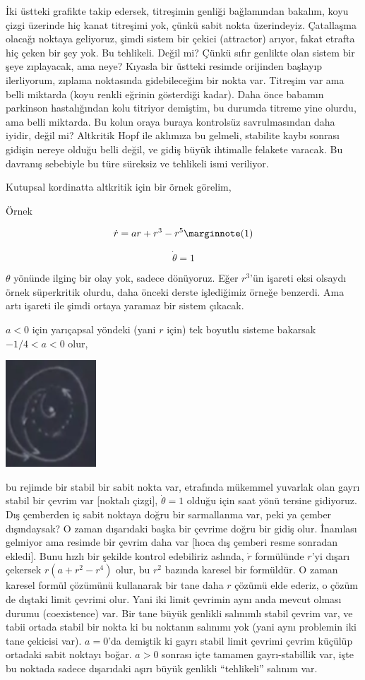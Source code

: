 \documentclass[12pt,fleqn]{article}\usepackage{../../common}
\begin{document}
İki üstteki grafikte takip edersek, titreşimin genliği bağlamından bakalım,
koyu çizgi üzerinde hiç kanat titreşimi yok, çünkü sabit nokta
üzerindeyiz. Çatallaşma olacağı noktaya geliyoruz, şimdi sistem bir çekici
(attractor) arıyor, fakat etrafta hiç çeken bir şey yok. Bu
tehlikeli. Değil mi?  Çünkü sıfır genlikte olan sistem bir şeye zıplayacak,
ama neye? Kıyasla bir üstteki resimde orijinden başlayıp ilerliyorum,
zıplama noktasında gidebileceğim bir nokta var. Titreşim var ama belli
miktarda (koyu renkli eğrinin gösterdiği kadar). Daha önce babamın
parkinson hastalığından kolu titriyor demiştim, bu durumda titreme yine
olurdu, ama belli miktarda. Bu kolun oraya buraya kontrolsüz savrulmasından
daha iyidir, değil mi? Altkritik Hopf ile aklımıza bu gelmeli, stabilite
kaybı sonrası gidişin nereye olduğu belli değil, ve gidiş büyük ihtimalle
felakete varacak. Bu davranış sebebiyle bu türe süreksiz ve tehlikeli ismi
veriliyor.

Kutupsal kordinatta altkritik için bir örnek görelim,

Örnek

$$ 
\dot{r} = ar + r^3 -r^5 
\mlabel{1} 
$$

$$ \dot{\theta} = 1 $$

$\theta$ yönünde ilginç bir olay yok, sadece dönüyoruz. Eğer $r^3$'ün
işareti eksi olsaydı örnek süperkritik olurdu, daha önceki derste
işlediğimiz örneğe benzerdi. Ama artı işareti ile şimdi ortaya yaramaz bir
sistem çıkacak.

$a < 0$ için yarıçapsal yöndeki (yani $r$ için) tek boyutlu sisteme
bakarsak $-1/4 < a < 0$ olur, 

\includegraphics[height=4cm]{13_06.png}

bu rejimde bir stabil bir sabit nokta var, etrafında mükemmel yuvarlak olan
gayrı stabil bir çevrim var [noktalı çizgi], $\dot{\theta}=1$ olduğu için
saat yönü tersine gidiyoruz. Dış çemberden iç sabit noktaya doğru bir
sarmallanma var, peki ya çember dışındaysak? O zaman dışarıdaki başka bir
çevrime doğru bir gidiş olur. İnanılası gelmiyor ama resimde bir çevrim
daha var [hoca dış çemberi resme sonradan ekledi]. Bunu hızlı bir şekilde
kontrol edebiliriz aslında, $\dot{r}$ formülünde $r$'yi dışarı çekersek
$r(a + r^2 -r^4)$ olur, bu $r^2$ bazında karesel bir formüldür. O zaman
karesel formül çözümünü kullanarak bir tane daha $r$ çözümü elde ederiz, o
çözüm de dıştaki limit çevrimi olur. Yani iki limit çevrimin aynı anda
mevcut olması durumu (coexistence) var. Bir tane büyük genlikli salınımlı
stabil çevrim var, ve tabii ortada stabil bir nokta ki bu noktanın salınımı
yok (yani aynı problemin iki tane çekicisi var). $a=0$'da demiştik ki gayrı
stabil limit çevrimi çevrim küçülüp ortadaki sabit noktayı boğar. $a>0$
sonrası içte tamamen gayrı-stabillik var, işte bu noktada sadece dışarıdaki
aşırı büyük genlikli ``tehlikeli'' salınım var. 
\end{document}
